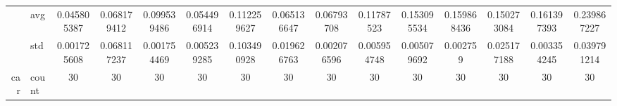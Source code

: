 \begin{table}[htbp]
{\begin{tabular}{rlccc|c|c|c|c|c|ccccc}
			                                                                               & avg                & \cellcolor[rgb]{ .388,  .745,  .482}\textcolor[rgb]{ 0,  .38,  0}{0.045805387} & \cellcolor[rgb]{ .592,  .804,  .494}0.068179412                                & \cellcolor[rgb]{ .882,  .886,  .51}0.099539486                                 & \cellcolor[rgb]{ .467,  .765,  .486}0.054496914 & \cellcolor[rgb]{ 1,  .922,  .518}0.112259627                                   & \cellcolor[rgb]{ .565,  .796,  .49}0.065136647  & \cellcolor[rgb]{ .588,  .8,  .49}0.06793708                                    & \cellcolor[rgb]{ 1,  .902,  .514}0.11787523     & \cellcolor[rgb]{ .992,  .761,  .486}0.153095534 & \cellcolor[rgb]{ .992,  .733,  .482}0.159868436 & \cellcolor[rgb]{ .992,  .773,  .49}0.150273084  & \cellcolor[rgb]{ .992,  .725,  .482}0.161397393 & \cellcolor[rgb]{ .973,  .412,  .42}0.239867227  \\
			                                                                               & std                & 0.001725608                                                                    & 0.068117237                                                                    & 0.001754469                                                                    & 0.005239285                                     & 0.103490928                                                                    & 0.019626763                                     & 0.002076596                                                                    & 0.005954748                                     & 0.005079692                                     & 0.002759                                        & 0.025177188                                     & 0.003354245                                     & 0.039791214                                     \\
			car                                                                            & count              & 30                                                                             & 30                                                                             & 30                                                                             & 30                                              & 30                                                                             & 30                                              & 30                                                                             & 30                                              & 30                                              & 30                                              & 30                                              & 30                                              & 30                                              \\

\end{tabular}}
\end{table}
